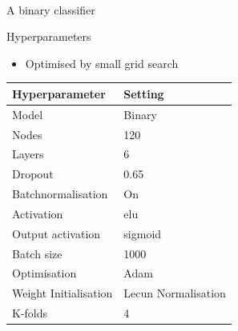 \begin{frame}
    \begin{center}
        \Huge \tHq \\ A binary classifier
    \end{center}
\end{frame}

\begin{frame}{Hyperparameters}
  \begin{itemize}
    \item Optimised by small grid search
  \end{itemize}
    \begin{table}[]
    \begin{tabular}{|l|l|}
    \hline
    Hyperparameter          &     Setting              \\ \hline
    Model                   &     Binary          \\ \hline
    Nodes                   &     120                  \\ \hline
    Layers                  &     6                    \\ \hline
    Dropout                 &     0.65                 \\ \hline
    Batchnormalisation      &     On                   \\ \hline
    Activation              &     elu                  \\ \hline
    Output activation       &     sigmoid              \\ \hline
    Batch size              &     1000                 \\ \hline
    Optimisation            &     Adam                 \\ \hline
    Weight Initialisation   &     Lecun Normalisation  \\ \hline
    K-folds                 &     4                    \\ \hline
    \end{tabular}
    \end{table}
\end{frame}


